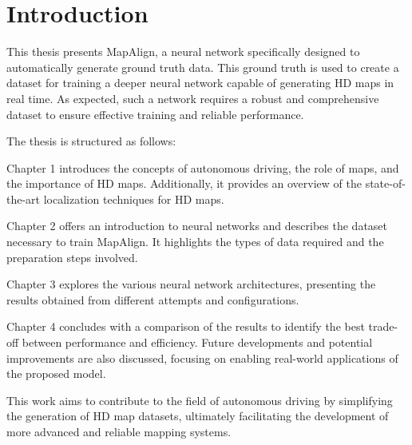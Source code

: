 \NoBgThispage
\chapter*{Introduction}

This thesis presents MapAlign, a neural network specifically designed to automatically generate ground truth data. This ground truth is used to create a dataset for training a deeper neural network capable of generating HD maps in real time. As expected, such a network requires a robust and comprehensive dataset to ensure effective training and reliable performance.

The thesis is structured as follows:

Chapter 1 introduces the concepts of autonomous driving, the role of maps, and the importance of HD maps. Additionally, it provides an overview of the state-of-the-art localization techniques for HD maps.

Chapter 2 offers an introduction to neural networks and describes the dataset necessary to train MapAlign. It highlights the types of data required and the preparation steps involved.

Chapter 3 explores the various neural network architectures, presenting the results obtained from different attempts and configurations.

Chapter 4 concludes with a comparison of the results to identify the best trade-off between performance and efficiency. Future developments and potential improvements are also discussed, focusing on enabling real-world applications of the proposed model.

This work aims to contribute to the field of autonomous driving by simplifying the generation of HD map datasets, ultimately facilitating the development of more advanced and reliable mapping systems.